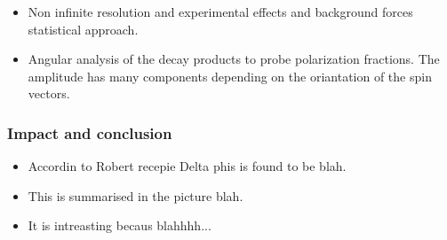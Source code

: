 \begin{itemize}
\item Non infinite resolution and experimental effects and background forces statistical approach.
\item Angular analysis of the decay products to probe polarization fractions. The amplitude has many
      components depending on the oriantation of the spin vectors.
\end{itemize}

\subsubsection{Impact and conclusion}

\begin{itemize}
\item Accordin to Robert recepie Delta phis is found to be blah.
\item This is summarised in the picture blah.
\item It is intreasting becaus blahhhh...
\end{itemize}
